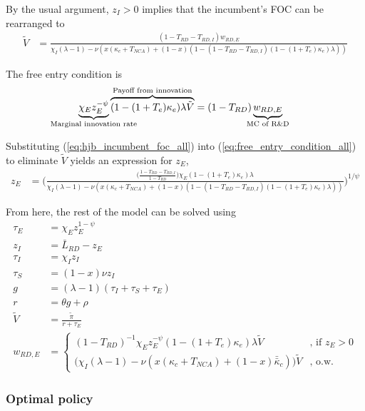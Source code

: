 \documentclass[11pt,english]{article}
\theoremstyle{remark}
\begin{document}
By the usual argument, $z_I > 0$ implies that the incumbent's FOC can be rearranged to
\begin{align}
\tilde{V} &= \frac{(1-T_{RD} - T_{RD,I})w_{RD,E}}{\chi_I(\lambda -1) - \nu (x(\kappa_c + T_{NCA}) + (1-x)(1 - (1-T_{RD} - T_{RD,I})(1-(1+T_e)\kappa_e)\lambda)) } \label{eq:hjb_incumbent_foc_all}
\end{align}

The free entry condition is
\begin{align}
\underbrace{\chi_E z_E^{-\psi}}_{\mathclap{\text{Marginal innovation rate}}} \overbrace{(1-(1+T_e)\kappa_e) \lambda \tilde{V}}^{\mathclap{\text{Payoff from innovation}}} &= (1-T_{RD})\underbrace{w_{RD,E}}_{\mathclap{\text{MC of R\&D}}} \label{eq:free_entry_condition_all}
\end{align}

Substituting (\ref{eq:hjb_incumbent_foc_all}) into (\ref{eq:free_entry_condition_all}) to eliminate $\tilde{V}$ yields an expression for $z_E$, 
\begin{align}
z_E &= \Bigg( \frac{\Big(\frac{1-T_{RD} -T_{RD,I}}{1-T_{RD}} \Big)\chi_E (1-(1+T_e)\kappa_{e}) \lambda}{\chi_I(\lambda -1) - \nu (x(\kappa_c + T_{NCA}) + (1-x)(1 - (1-T_{RD} - T_{RD,I})(1-(1+T_e)\kappa_e)\lambda)) } \Bigg)^{1/\psi} \label{eq:effort_entrant_all}
\end{align}

From here, the rest of the model can be solved using
\begin{align}
\tau_E &= \chi_E z_E^{1-\psi} \\
z_I &= \bar{L}_{RD} - z_E \label{eq:labor_resource_constraint_all}\\ 
\tau_I &= \chi_I z_I \\
\tau_S &= (1-x) \nu z_I \\
g &= (\lambda - 1) (\tau_I + \tau_S + \tau_E) \\
r &= \theta g + \rho \\
\tilde{V} &= \frac{\tilde{\pi}}{r + \tau_E} \\ 
w_{RD,E} &= \begin{cases}
(1-T_{RD})^{-1}\chi_E z_E^{-\psi} (1-(1+T_e)\kappa_e) \lambda \tilde{V} &\textrm{, if } z_E > 0\\
\Big( \chi_I(\lambda -1) - \nu (x(\kappa_c + T_{NCA}) + (1-x)\bar{\bar{\kappa}}_c)\Big) \tilde{V} &\textrm{, o.w.}
\end{cases} \label{eq:wage_rd_labor_all}
\end{align}

\subsubsection{Optimal policy}
\end{document}
